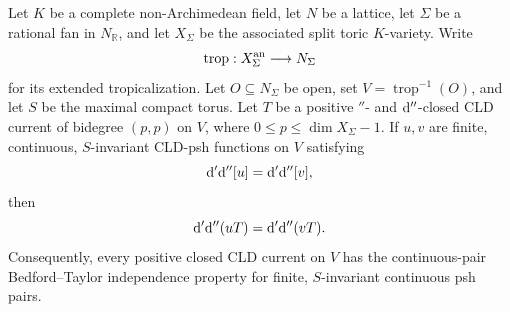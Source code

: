 \begin{proposition}
\label{prop:p213-invariant-toric-boundary-continuous-pairs-candidate}
Let $K$ be a complete non-Archimedean field, let $N$ be a lattice, let
$\Sigma$ be a rational fan in $N_{\mathbb R}$, and let $X_\Sigma$ be the
associated split toric $K$-variety.  Write
\[
 \operatorname{trop}:X_\Sigma^{\mathrm{an}}\longrightarrow N_\Sigma
\]
for its extended tropicalization.  Let $O\subseteq N_\Sigma$ be open, set
$V=\operatorname{trop}^{-1}(O)$, and let $S$ be the maximal compact torus.
Let $T$ be a positive $\dprime$- and $\mathrm d''$-closed CLD current of
bidegree $(p,p)$ on $V$, where $0\leq p\leq \dim X_\Sigma-1$.  If $u,v$ are
finite, continuous, $S$-invariant CLD-psh functions on $V$ satisfying
\[
 \mathrm d'\mathrm d''[u]=\mathrm d'\mathrm d''[v],
\]
then
\[
 \mathrm d'\mathrm d''(uT)=\mathrm d'\mathrm d''(vT).
\]
Consequently, every positive closed CLD current on $V$ has the
continuous-pair Bedford--Taylor independence property for finite,
$S$-invariant continuous psh pairs.
\end{proposition}
